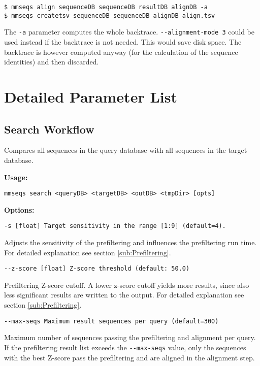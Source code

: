 \documentclass[11pt,a4paper]{scrreprt}
\begin{document}
\begin{verbatim}
$ mmseqs align sequenceDB sequenceDB resultDB alignDB -a
$ mmseqs createtsv sequenceDB sequenceDB alignDB align.tsv 
\end{verbatim}

The \texttt{-a} parameter computes the whole backtrace. \texttt{-{}-alignment-mode 3} could be used instead if the backtrace is not needed. This would save disk space. The backtrace is however computed anyway (for the calculation of the sequence identities) and then discarded.

\section{Detailed Parameter List} \label{sec:Detailed-parameter-list}
\subsection{Search Workflow} \label{sub:Search-workflow}
Compares all sequences in the query database with all sequences in
the target database. 

\textbf{Usage:}

\texttt{mmseqs search <queryDB> <targetDB> <outDB> <tmpDir> {[}opts{]}}

\textbf{Options:}

\texttt{\small -s {[}float{]} Target sensitivity in the range {[}1:9{]} (default=4).}{\small \par}

Adjusts the sensitivity of the prefiltering and influences the prefiltering run time. For detailed explanation see section \ref{sub:Prefiltering}.

\texttt{\small -{}-z-score {[}float{]} Z-score threshold (default: 50.0)}{\small \par}

Prefiltering Z-score cutoff. A lower z-score cutoff yields more results, since also less significant results are written to the output. For detailed explanation see section \ref{sub:Prefiltering}.

\texttt{\small -{}-max-seqs Maximum result sequences per query (default=300)}{\small \par}

Maximum number of sequences passing the prefiltering and alignment per query. If the prefiltering result list exceeds the \texttt{-{}-max-seqs} value, only the sequences with the best Z-score pass the prefiltering and are aligned in the alignment step.
\end{document}
